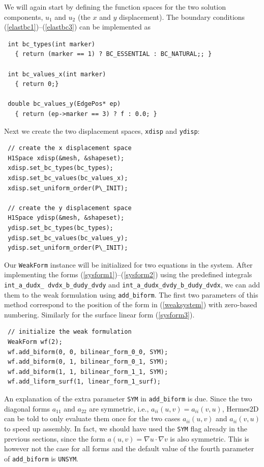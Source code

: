 \documentclass[11pt]{article}
\begin{document}
We will again start by defining the function spaces for the two solution
components, $u_1$ and $u_2$ (the $x$ and $y$ displacement). The boundary
conditions (\ref{elastbc1})--(\ref{elastbc3}) can be implemented as
\begin{lstlisting}
 int bc_types(int marker)
   { return (marker == 1) ? BC_ESSENTIAL : BC_NATURAL;; }

 int bc_values_x(int marker)
   { return 0;}

 double bc_values_y(EdgePos* ep)
   { return (ep->marker == 3) ? f : 0.0; }
\end{lstlisting}
Next we create the two displacement spaces,
{\tt xdisp} and {\tt ydisp}:
\begin{lstlisting}
 // create the x displacement space
 H1Space xdisp(&mesh, &shapeset);
 xdisp.set_bc_types(bc_types);
 xdisp.set_bc_values(bc_values_x);
 xdisp.set_uniform_order(P\_INIT);

 // create the y displacement space
 H1Space ydisp(&mesh, &shapeset);
 ydisp.set_bc_types(bc_types);
 ydisp.set_bc_values(bc_values_y);
 ydisp.set_uniform_order(P\_INIT);
\end{lstlisting}

Our {\tt WeakForm} instance will be initialized for two equations in the system.
After implementing the forms (\ref{sysform1})--(\ref{sysform2}) using the predefined integrals
{\tt int\_a\_dudx\_ dvdx\_b\_dudy\_dvdy} and {\tt int\_a\_dudx\_dvdy\_b\_dudy\_dvdx},
we can add them to the weak formulation using {\tt add\_biform}.
The first two parameters of this method correspond to the position of the form
in (\ref{weaksystem}) with zero-based numbering. Similarly for the surface linear form
(\ref{sysform3}).

\begin{lstlisting}
 // initialize the weak formulation
 WeakForm wf(2);
 wf.add_biform(0, 0, bilinear_form_0_0, SYM);
 wf.add_biform(0, 1, bilinear_form_0_1, SYM);
 wf.add_biform(1, 1, bilinear_form_1_1, SYM);
 wf.add_liform_surf(1, linear_form_1_surf);
\end{lstlisting}

An explanation of the extra parameter {\tt SYM} in {\tt add\_biform} is due.
Since the two diagonal forms $a_{11}$ and $a_{22}$ are symmetric, i.e.,
$a_{ii}(u,v) = a_{ii}(v,u)$, Hermes2D can be told to only evaluate them once for the
two cases $a_{ii}(u,v)$ and $a_{ii}(v,u)$ to speed up assembly. In fact, we should have
used the {\tt SYM} flag already in the previous sections, since the form
$a(u,v) = \nabla u \cdot \nabla v$ is also symmetric. This is however not the case
for all forms and the default value of the fourth parameter of {\tt add\_biform} is {\tt UNSYM}.
\end{document}
